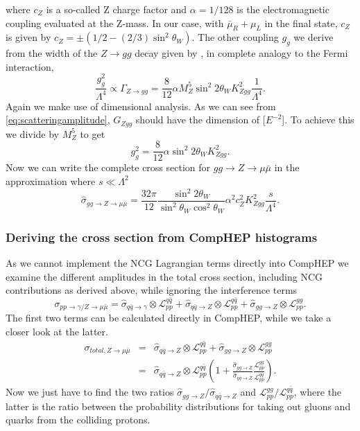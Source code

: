 where $c_Z$ is a so-called Z charge factor and $\alpha = 1/128$ is the electromagnetic coupling evaluated at the Z-mass. In our case, with $\bar \mu_R + \mu_L$ in the final state, $c_Z$ is given by $c_Z = \pm (1/2 - (2/3)\sin^2{\theta_W})$. The other coupling $g_g$ we derive from the width of the $Z \rightarrow gg$ decay given by \cite{behr2003dnc}, in complete analogy to the Fermi interaction,
\begin{equation}
	\frac{g_g^2}{\Lambda^4} \propto \Gamma_{Z \rightarrow gg} = \frac{8}{12} \alpha M_Z^5 \sin^2{2\theta_W} K_{Zgg}^2 \frac{1}{\Lambda^4}.
\end{equation}
Again we make use of dimensional analysis. As we can see from \eqref{eq:scatteringamplitude}, $G_{Zgg}$ should have the dimension of [$E^{-2}$]. To achieve this we divide by $M_Z^5$ to get
\begin{equation}
	g_g^2 = \frac{8}{12} \alpha \sin^2{2\theta_W} K_{Zgg}^2.
\end{equation}
Now we can write the complete cross section for $gg \rightarrow Z \rightarrow \mu \bar \mu$ in the approximation where $s \ll \Lambda^2$
\begin{equation} \label{eq:sigmahatgg}
	\hat \sigma_{gg \rightarrow Z \rightarrow \mu \bar \mu} = \frac{32\pi}{12} \frac{\sin^2{2\theta_W}}{\sin^2{\theta_W}\cos^2{\theta_W}} \alpha^2 c_Z^2 K_{Zgg}^2 \frac{s}{\Lambda^4}.
\end{equation}

\subsubsection{Deriving the cross section from CompHEP histograms}
As we cannot implement the NCG Lagrangian terms directly into CompHEP we examine the different amplitudes in the total cross section, including NCG contributions as derived above, while ignoring the interference terms
\begin{equation}
	\sigma_{pp \rightarrow \gamma/ Z \rightarrow \mu \bar \mu} = \hat \sigma_{q \bar q \rightarrow \gamma} \otimes \mathcal{L}_{pp}^{q \bar q}+ \hat \sigma_{q \bar q \rightarrow Z} \otimes \mathcal{L}_{pp}^{q \bar q}+ \hat \sigma_{gg \rightarrow Z} \otimes \mathcal{L}_{pp}^{gg}.
\end{equation}
The first two terms can be calculated directly in CompHEP, while we take a closer look at the latter. 
\begin{eqnarray} \label{eq:qqggztotal}
	\sigma_{total, Z \rightarrow \mu \bar \mu} &=& \hat \sigma_{q \bar q \rightarrow Z} \otimes \mathcal{L}_{pp}^{q \bar q}+ \hat \sigma_{gg \rightarrow Z} \otimes \mathcal{L}_{pp}^{gg} \nonumber \\
	&=&\hat \sigma_{q \bar q \rightarrow Z} \otimes \mathcal{L}_{pp}^{q \bar q} \left (1+ \frac{\hat \sigma_{gg \rightarrow Z}}{\hat \sigma_{q \bar q \rightarrow Z}} \frac{\mathcal{L}_{pp}^{gg}} {\mathcal{L}_{pp}^{q \bar q}} \right ).
\end{eqnarray}
Now we just have to find the two ratios ${\hat \sigma_{gg \rightarrow Z}}/{\hat \sigma_{q \bar q \rightarrow Z}}$ and ${\mathcal{L}_{pp}^{gg}}/{\mathcal{L}_{pp}^{q \bar q}}$, where the latter is the ratio between the probability distributions for taking out gluons and quarks from the colliding protons.

